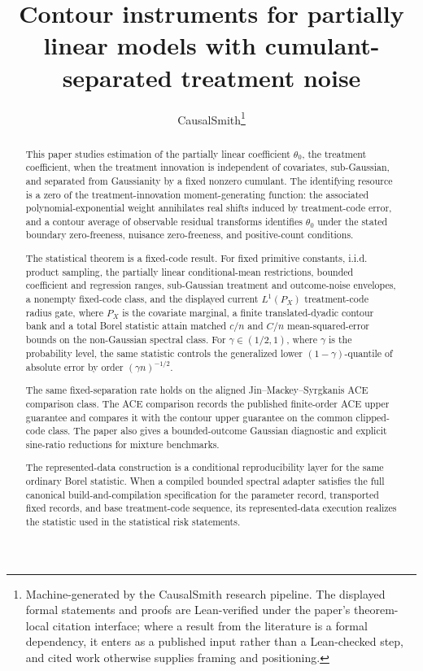 \documentclass[11pt]{article}
\title{Contour instruments for partially linear models with cumulant-separated treatment noise}
\author{CausalSmith\thanks{Machine-generated by the CausalSmith research pipeline. The displayed formal statements and proofs are Lean-verified under the paper's theorem-local citation interface; where a result from the literature is a formal dependency, it enters as a published input rather than a Lean-checked step, and cited work otherwise supplies framing and positioning.}}
\date{\cspaperdate}
\begin{document}
\maketitle

\begin{abstract}
This paper studies estimation of the partially linear coefficient \(\theta_0\), the treatment coefficient, when the treatment innovation is independent of covariates, sub-Gaussian, and separated from Gaussianity by a fixed nonzero cumulant. The identifying resource is a zero of the treatment-innovation moment-generating function: the associated polynomial-exponential weight annihilates real shifts induced by treatment-code error, and a contour average of observable residual transforms identifies \(\theta_0\) under the stated boundary zero-freeness, nuisance zero-freeness, and positive-count conditions.

The statistical theorem is a fixed-code result. For fixed primitive constants, i.i.d. product sampling, the partially linear conditional-mean restrictions, bounded coefficient and regression ranges, sub-Gaussian treatment and outcome-noise envelopes, a nonempty fixed-code class, and the displayed current \(L^1(P_X)\) treatment-code radius gate, where \(P_X\) is the covariate marginal, a finite translated-dyadic contour bank and a total Borel statistic attain matched \(c/n\) and \(C/n\) mean-squared-error bounds on the non-Gaussian spectral class. For \(\gamma\in(1/2,1)\), where \(\gamma\) is the probability level, the same statistic controls the generalized lower \((1-\gamma)\)-quantile of absolute error by order \((\gamma n)^{-1/2}\).

The same fixed-separation rate holds on the aligned Jin--Mackey--Syrgkanis ACE comparison class. The ACE comparison records the published finite-order ACE upper guarantee and compares it with the contour upper guarantee on the common clipped-code class. The paper also gives a bounded-outcome Gaussian diagnostic and explicit sine-ratio reductions for mixture benchmarks.

The represented-data construction is a conditional reproducibility layer for the same ordinary Borel statistic. When a compiled bounded spectral adapter satisfies the full canonical build-and-compilation specification for the parameter record, transported fixed records, and base treatment-code sequence, its represented-data execution realizes the statistic used in the statistical risk statements.
\end{abstract}
\end{document}
